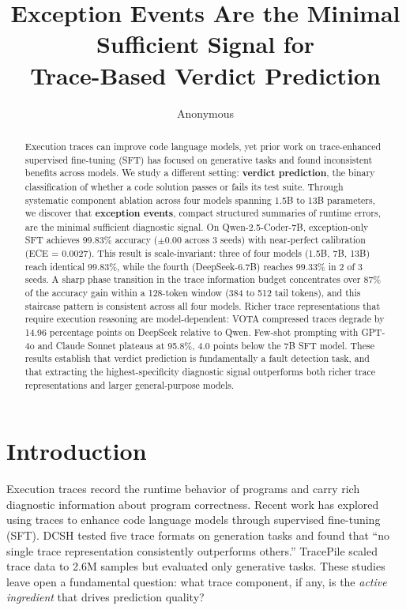 \documentclass[11pt]{article}
\title{Exception Events Are the Minimal Sufficient Signal for\\Trace-Based Verdict Prediction}
\author{Anonymous}
\date{}
\begin{document}
\maketitle

\begin{abstract}
Execution traces can improve code language models, yet prior work on trace-enhanced supervised fine-tuning (SFT) has focused on generative tasks and found inconsistent benefits across models. We study a different setting: \textbf{verdict prediction}, the binary classification of whether a code solution passes or fails its test suite. Through systematic component ablation across four models spanning 1.5B to 13B parameters, we discover that \textbf{exception events}, compact structured summaries of runtime errors, are the minimal sufficient diagnostic signal.
On Qwen-2.5-Coder-7B, exception-only SFT achieves 99.83\% accuracy ($\pm$0.00 across 3 seeds) with near-perfect calibration (ECE = 0.0027). This result is scale-invariant: three of four models (1.5B, 7B, 13B) reach identical 99.83\%, while the fourth (DeepSeek-6.7B) reaches 99.33\% in 2 of 3 seeds. A sharp phase transition in the trace information budget concentrates over 87\% of the accuracy gain within a 128-token window (384 to 512 tail tokens), and this staircase pattern is consistent across all four models. Richer trace representations that require execution reasoning are model-dependent: VOTA compressed traces degrade by 14.96 percentage points on DeepSeek relative to Qwen. Few-shot prompting with GPT-4o and Claude Sonnet plateaus at 95.8\%, 4.0 points below the 7B SFT model. These results establish that verdict prediction is fundamentally a fault detection task, and that extracting the highest-specificity diagnostic signal outperforms both richer trace representations and larger general-purpose models.
\end{abstract}

\section{Introduction}

Execution traces record the runtime behavior of programs and carry rich diagnostic information about program correctness. Recent work has explored using traces to enhance code language models through supervised fine-tuning (SFT). DCSH \citep{dcsh2025} tested five trace formats on generation tasks and found that ``no single trace representation consistently outperforms others.'' TracePile \citep{tracepile2025} scaled trace data to 2.6M samples but evaluated only generative tasks. These studies leave open a fundamental question: what trace component, if any, is the \emph{active ingredient} that drives prediction quality?
\end{document}
